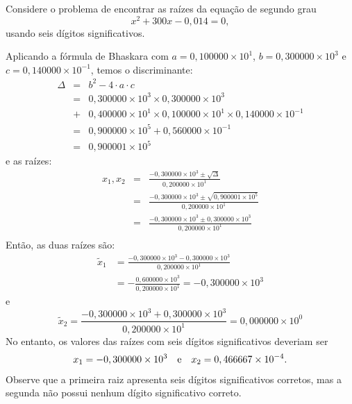 \begin{ex} Considere o problema de encontrar as raízes da equação de segundo grau
  \begin{equation*}
    x^2+300x-0,014=0,
  \end{equation*}
usando seis dígitos significativos.

Aplicando a fórmula de Bhaskara com $a=0,100000\times 10^1$, $b=0,300000\times 10^3$ e $c=0,140000\times 10^{-1}$, temos o discriminante:
\begin{eqnarray*}
  \Delta &=& b^2 - 4\cdot a\cdot c\\
  &=&0,300000\times 10^3\times 0,300000\times 10^3 \\
  &+& 0,400000\times 10^1\times 0,100000\times 10^1\times 0,140000\times 10^{-1}\\
  &=&0,900000\times 10^5 +0,560000\times  10^{-1}\\
  &=&0,900001\times 10^5
\end{eqnarray*}
e as raízes:
\begin{eqnarray*}
x_1,x_2 &=& \frac{-0,300000\times 10^3\pm \sqrt{\Delta}}{0,200000\times 10^1} \\
&=& \frac{-0,300000\times 10^3\pm \sqrt{0,900001\times 10^5}}{0,200000\times 10^1} \\
&=& \frac{-0,300000\times 10^3\pm 0,300000\times 10^3}{0,200000\times 10^1}\\
\end{eqnarray*}
Então, as duas raízes são:
\begin{equation*}
  \begin{split}
  \tilde{x}_1 &= \frac{-0,300000\times 10^3- 0,300000\times 10^3}{0,200000\times 10^1}\\
  &=-\frac{0,600000\times 10^3}{0,200000\times 10^1}=-0,300000\times 10^3    
  \end{split}
\end{equation*}
e
\begin{equation*}
\tilde{x}_2=\frac{-0,300000\times 10^3+ 0,300000\times 10^3}{0,200000\times 10^1}=0,000000\times 10^{0} 
\end{equation*}
No entanto, os valores das raízes com seis dígitos significativos deveriam ser
\begin{equation*}
  x_1=-0,300000\times 10^{3}\quad\hbox{e}\quad x_2=0,466667\times 10^{-4}.  
\end{equation*}
Observe que a primeira raiz apresenta seis dígitos significativos corretos, mas a segunda não possui nenhum dígito significativo correto.



\end{ex}
